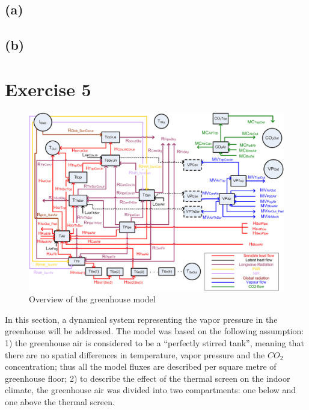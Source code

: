 \documentclass[a4paper]{article}
\begin{document}
\subsection{(a)}

\subsection{(b)}




\newpage
\section{Exercise 5}
\begin{figure}[H]
  \centering
  \includegraphics[width=\textwidth]{overview}
  \caption{Overview of the greenhouse model}\label{fig:overview}
\end{figure}

In this section, a dynamical system representing the vapor pressure in the greenhouse will be addressed.
The model was based on the following assumption:
1) the greenhouse air is considered to be a ``perfectly stirred tank'', meaning that there are no spatial differences in temperature, vapor pressure and the \(CO_2\) concentration; thus all the model fluxes are described per square metre of greenhouse floor;
2) to describe the effect of the thermal screen on the indoor climate, the greenhouse air was divided into two compartments: one below and one above the thermal screen.
\end{document}
